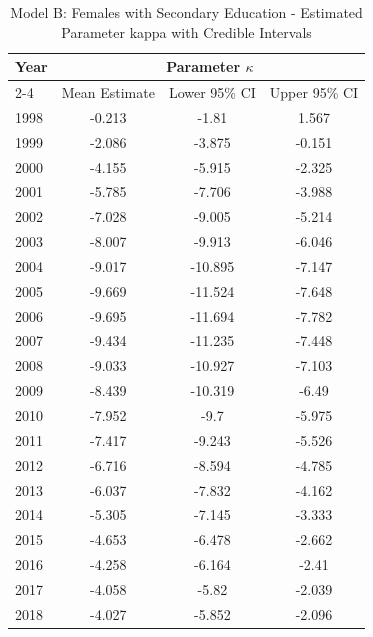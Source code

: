 \begin{landscape}
\begin{table}[htbp]
\centering
\caption{Model B: Females with Secondary Education - Estimated Parameter kappa  with Credible Intervals}
\label{tab:parameters_k11}
\begin{tabular}{@{}lccc@{}}
\toprule
Year & \multicolumn{3}{c}{Parameter \(\kappa\)} \\
\cmidrule(lr){2-4}
      & Mean Estimate & Lower 95\% CI & Upper 95\% CI \\
\midrule
1998 & -0.213 & -1.81 & 1.567 \\
1999 & -2.086 & -3.875 & -0.151 \\
2000 & -4.155 & -5.915 & -2.325 \\
2001 & -5.785 & -7.706 & -3.988 \\
2002 & -7.028 & -9.005 & -5.214 \\
2003 & -8.007 & -9.913 & -6.046 \\
2004 & -9.017 & -10.895 & -7.147 \\
2005 & -9.669 & -11.524 & -7.648 \\
2006 & -9.695 & -11.694 & -7.782 \\
2007 & -9.434 & -11.235 & -7.448 \\
2008 & -9.033 & -10.927 & -7.103 \\
2009 & -8.439 & -10.319 & -6.49 \\
2010 & -7.952 & -9.7 & -5.975 \\
2011 & -7.417 & -9.243 & -5.526 \\
2012 & -6.716 & -8.594 & -4.785 \\
2013 & -6.037 & -7.832 & -4.162 \\
2014 & -5.305 & -7.145 & -3.333 \\
2015 & -4.653 & -6.478 & -2.662 \\
2016 & -4.258 & -6.164 & -2.41 \\
2017 & -4.058 & -5.82 & -2.039 \\
2018 & -4.027 & -5.852 & -2.096 \\
\bottomrule
\end{tabular}
\end{table}
\end{landscape}